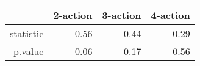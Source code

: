 \begin{table}[ht]
\centering
\begin{tabular}{rrrr}
  \hline
 & 2-action & 3-action & 4-action \\ 
  \hline
statistic & 0.56 & 0.44 & 0.29 \\ 
  p.value & 0.06 & 0.17 & 0.56 \\ 
   \hline
\end{tabular}
\end{table}
